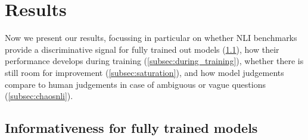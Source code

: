 \section{Results}

Now we present our results, focussing in particular on whether NLI benchmarks provide a discriminative signal for fully trained out models (\cref{subsec:fully_trained}), how their performance develops during training (\cref{subsec:during_training}), whether there is still room for improvement (\cref{subsec:saturation}), and how model judgements compare to human judgements in case of ambiguous or vague questions (\cref{subsec:chaosnli}).

\subsection{Informativeness for fully trained models}\label{subsec:fully_trained}

